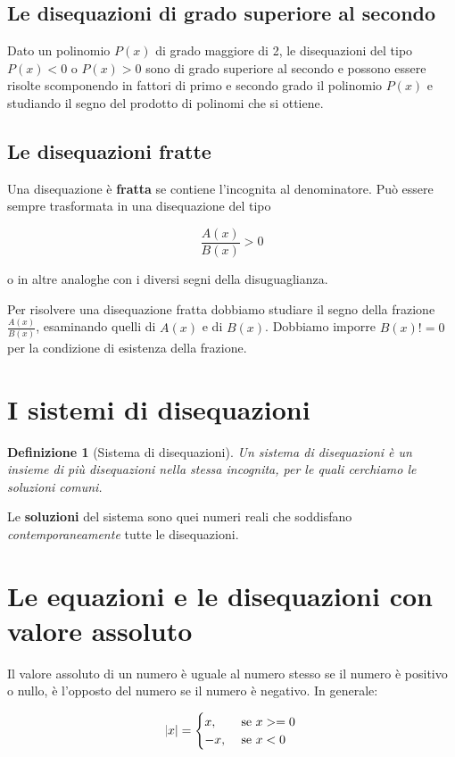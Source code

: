 \documentclass[12pt, letterpaper]{article}
\newtheorem{definition}{Definizione}[section]
\begin{document}
	\subsection{Le disequazioni di grado superiore al secondo}
	Dato un polinomio $P(x)$ di grado maggiore di 2, le disequazioni del tipo $P(x)<0$ o $P(x)>0$ sono di grado superiore al secondo e possono essere risolte scomponendo in fattori di primo e secondo grado il polinomio $P(x)$ e studiando il segno del prodotto di polinomi che si ottiene.
	
	\subsection{Le disequazioni fratte}
	Una disequazione è \textbf{fratta} se contiene l'incognita al denominatore. Può essere sempre trasformata in una disequazione del tipo
	
	\[
		\frac{A(x)}{B(x)} > 0
	\]
	
	o in altre analoghe con i diversi segni della disuguaglianza.
	
	Per risolvere una disequazione fratta dobbiamo studiare il segno della frazione $\frac{A(x)}{B(x)}$, esaminando quelli di $A(x)$ e di $B(x)$. Dobbiamo imporre $B(x) != 0$ per la condizione di esistenza della frazione.
	
	\section{I sistemi di disequazioni}
	
	\begin{definition}[Sistema di disequazioni]
		Un sistema di disequazioni è un insieme di più disequazioni nella stessa incognita, per le quali cerchiamo le soluzioni comuni.
	\end{definition}
	
	Le \textbf{soluzioni} del sistema sono quei numeri reali che soddisfano \textit{contemporaneamente} tutte le disequazioni.
	
	\section{Le equazioni e le disequazioni con valore assoluto}
	
	Il valore assoluto di un numero è uguale al numero stesso se il numero è positivo o nullo, è l'opposto del numero se il numero è negativo. In generale:
	
	\begin{tcolorbox}
			\[
			\abs{x} = 
			\begin{cases}
				x, & \mbox{ se } x >= 0\\
				-x, & \mbox{ se } x < 0
			\end{cases}
			\]
	\end{tcolorbox}
	
\end{document}
